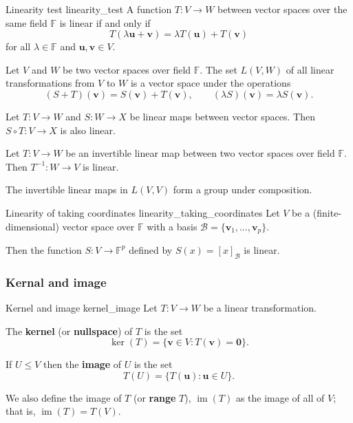 \begin{lemma}{Linearity test \cite{math2601_notes}}{linearity_test}
	A function $T : V \to W$ between vector spaces over the same field $\mathbb{F}$ is linear if and only if
	$$ T(\lambda \mathbf{u} + \mathbf{v}) = \lambda T(\mathbf{u}) + T(\mathbf{v}) $$
	for all $\lambda \in \mathbb{F}$ and $\mathbf{u},\mathbf{v} \in V$.
\end{lemma}

\begin{theorem}{\cite{math2601_notes}}{}
	Let $V$ and $W$ be two vector spaces over field $\mathbb{F}$. The set $L(V, W)$ of all linear transformations from $V$ to $W$ is a vector space under the operations
	$$
		(S + T)(\mathbf{v}) = S(\mathbf{v}) + T(\mathbf{v}), \qquad
		(\lambda S)(\mathbf{v}) = \lambda S(\mathbf{v}) .
	$$
\end{theorem}

\begin{lemma}{\cite{math2601_notes}}{}
	Let $T : V \to W$ and $S : W \to X$ be linear maps between vector spaces. Then $S \circ T : V \to X$ is also linear.
\end{lemma}

\begin{lemma}{\cite{math2601_notes}}{}
	Let $T : V \to W$ be an invertible linear map between two vector spaces over field $\mathbb{F}$. Then $T^{-1} : W \to V$ is linear.
\end{lemma}

\begin{theorem}{\cite{math2601_notes}}{}
	The invertible linear maps in $L(V, V)$ form a group under composition.
\end{theorem}

\begin{lemma}{Linearity of taking coordinates \cite{math2601_notes}}{linearity_taking_coordinates}
	Let $V$ be a (finite-dimensional) vector space over $\mathbb{F}$ with a basis $\mathcal{B} = \{ \mathbf{v}_1, \ldots, \mathbf{v}_p \}$.

	Then the function $S : V \to \mathbb{F}^p$ defined by $S(x) = [x]_{\mathcal{B}}$ is linear.
\end{lemma}

\subsubsection{Kernal and image}

\begin{definition}{Kernel and image \cite{math2601_notes}}{kernel_image}
	Let $T : V \to W$ be a linear transformation.
	
	The \textbf{kernel} (or \textbf{nullspace}) of $T$ is the set
	$$ \operatorname{ker}(T) = \{ \mathbf{v} \in V : T(\mathbf{v}) = \mathbf{0} \} . $$

	If $U \leq V$ then the \textbf{image} of $U$ is the set
	$$ T(U) = \{ T(\mathbf{u}) : \mathbf{u} \in U \} . $$

	We also define the image of $T$ (or \textbf{range} $T$), $\operatorname{im}(T)$ as the image of all of $V$; that is, $\operatorname{im}(T) = T(V)$.
\end{definition}

